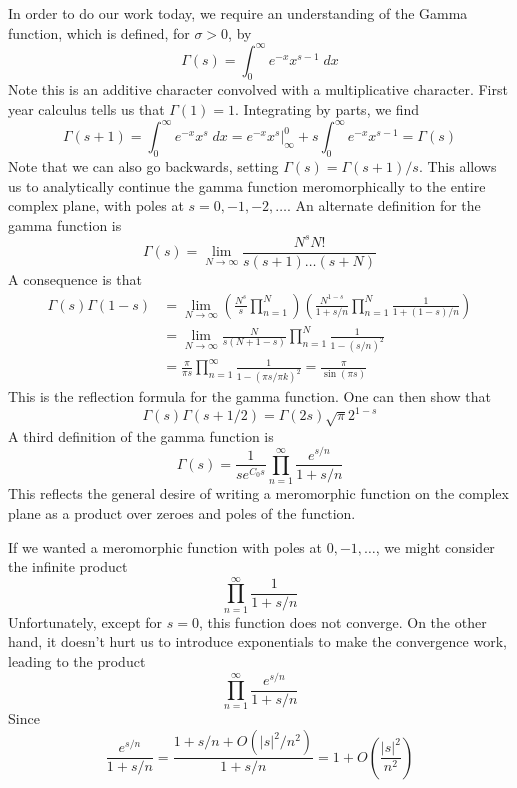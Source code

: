 In order to do our work today, we require an understanding of the Gamma function, which is defined, for $\sigma > 0$, by
%
\[ \Gamma(s) = \int_0^\infty e^{-x} x^{s-1}\; dx \]
%
Note this is an additive character convolved with a multiplicative character. First year calculus tells us that $\Gamma(1) = 1$. Integrating by parts, we find
%
\[ \Gamma(s+1) = \int_0^\infty e^{-x} x^s\; dx = \left. e^{-x}x^s \right|_\infty^0 + s \int_0^\infty e^{-x} x^{s-1} = \Gamma(s) \]
%
Note that we can also go backwards, setting $\Gamma(s) = \Gamma(s+1)/s$. This allows us to analytically continue the gamma function meromorphically to the entire complex plane, with poles at $s = 0, -1, -2 ,\dots$. An alternate definition for the gamma function is
%
\[ \Gamma(s) = \lim_{N \to \infty} \frac{N^s N!}{s(s+1) \dots (s+N)} \]
%
A consequence is that
%
\begin{align*}
    \Gamma(s)\Gamma(1-s) &= \lim_{N \to \infty} \left( \frac{N^s}{s} \prod_{n = 1}^N \right) \left( \frac{N^{1-s}}{1 + s/n} \prod_{n = 1}^N \frac{1}{1 + (1-s)/n} \right)\\
    &= \lim_{N \to \infty} \frac{N}{s(N+1-s)} \prod_{n = 1}^N \frac{1}{1 - (s/n)^2}\\
    &= \frac{\pi}{\pi s} \prod_{n = 1}^\infty \frac{1}{1 - (\pi s / \pi k)^2} = \frac{\pi}{\sin(\pi s)}
\end{align*}
%
This is the reflection formula for the gamma function. One can then show that
%
\[ \Gamma(s) \Gamma(s + 1/2) = \Gamma(2s) \sqrt{\pi} 2^{1-s} \]
%
A third definition of the gamma function is
%
\[ \Gamma(s) = \frac{1}{se^{C_0 s}} \prod_{n = 1}^\infty \frac{e^{s/n}}{1 + s/n} \]
%
This reflects the general desire of writing a meromorphic function on the complex plane as a product over zeroes and poles of the function.

\begin{remark}
    If we wanted a meromorphic function with poles at $0, -1, \dots$, we might consider the infinite product
    \[ \prod_{n = 1}^\infty \frac{1}{1 + s/n} \]
    Unfortunately, except for $s = 0$, this function does not converge. On the other hand, it doesn't hurt us to introduce exponentials to make the convergence work, leading to the product
    \[ \prod_{n = 1}^\infty \frac{e^{s/n}}{1 + s/n}  \]
    Since
    \[ \frac{e^{s/n}}{1 + s/n} = \frac{1 + s/n + O(|s|^2/n^2)}{1 + s/n} = 1 + O \left( \frac{|s|^2}{n^2} \right) \]
\end{remark}

